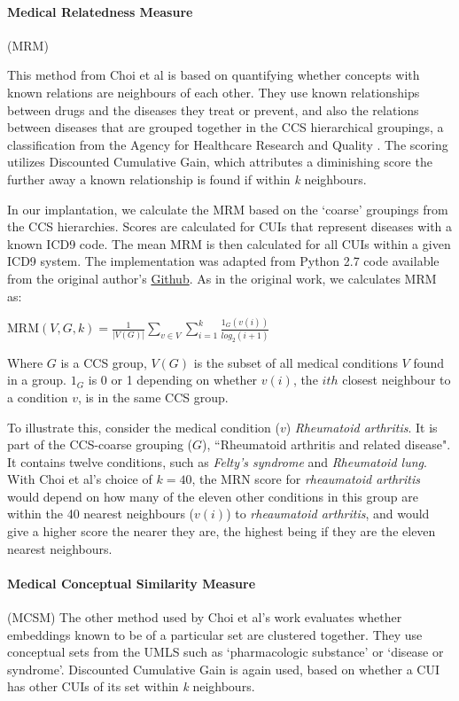 \documentclass[11pt,a4paper]{article}
\begin{document}
\paragraph{Medical Relatedness Measure}(MRM)

This method from Choi et al  is based on quantifying whether concepts with known relations are neighbours of each other.  They use known relationships between drugs and the diseases they treat or prevent, and also the relations between diseases that are grouped together in the CCS hierarchical groupings, a classification from the Agency for Healthcare Research and Quality \cite{ClinicalClassificationsSoftware}. The scoring utilizes Discounted Cumulative Gain, which attributes a diminishing score the further away a known relationship is found if within \emph{k} neighbours. 

In our implantation, we calculate the MRM based on the `coarse' groupings from the CCS hierarchies. Scores are calculated for CUIs that represent diseases with a known ICD9 code. The mean MRM is then calculated for all CUIs within a given ICD9 system. The implementation was adapted from Python 2.7 code available from the original author's \href{https://github.com/clinicalml/embeddings}{Github}. As in the original work, we calculates MRM as:

MRM$(V,G,k) = \frac{1}{|V(G)|}\sum\limits_{v\in V}\sum\limits_{i=1}^k \frac{1_G(v(i))}{log_2(i+1)}$

Where $G$ is a CCS group, $V(G)$ is the subset of all medical conditions $V$ found in a group. $1_G$ is 0 or 1 depending on whether $v(i)$, the $ith$ closest neighbour to a condition $v$, is in the same CCS group.  

To illustrate this, consider the medical condition ($v$) \emph{Rheumatoid arthritis}. It is part of the CCS-coarse grouping ($G$), ``Rheumatoid arthritis and related disease". It contains twelve conditions, such as \emph{Felty's syndrome} and \emph{Rheumatoid lung}. With Choi et al's choice of $k=40$, the MRN score for \emph{rheaumatoid arthritis} would depend on how many of the eleven other conditions in this group are within the 40 nearest neighbours ($v(i)$) to \emph{rheaumatoid arthritis}, and would give a higher score the nearer they are, the highest being if they are the eleven nearest neighbours. 

\paragraph{Medical Conceptual Similarity Measure}(MCSM) The other method used by Choi et al's work evaluates whether embeddings known to be of a particular set are clustered together. They use conceptual sets from the UMLS such as `pharmacologic substance' or `disease or syndrome'.  Discounted Cumulative Gain is again used, based on whether a CUI has other CUIs of its set within \emph{k} neighbours. 
\end{document}
